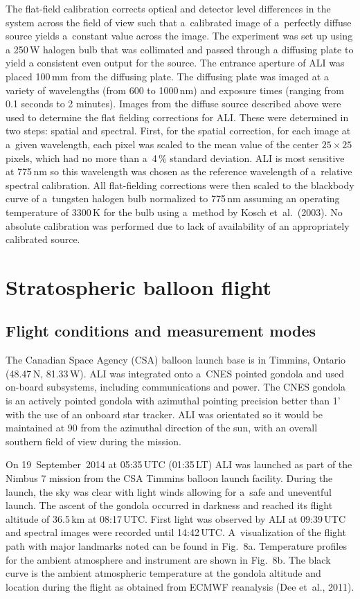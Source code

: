 \documentclass[amtd, online, hvmath]{copernicus}
\begin{document}
The flat-field calibration corrects optical and detector level
differences in the system across the field of view such that
a~calibrated image of a~perfectly diffuse source yields a~constant
value across the image. The experiment was set up using a 250\,W halogen bulb that was collimated and passed through a diffusing plate to yield a consistent even output for the source. The entrance aperture of ALI was placed 100\,mm from the diffusing plate. The diffusing plate was imaged at a variety of wavelengths (from 600 to 1000\,nm) and exposure times (ranging from 0.1 seconds to 2 minutes). Images from the diffuse source
described above were used to determine the flat fielding corrections
for ALI. These were determined in two steps: spatial and
spectral. First, for the spatial correction, for each image at a~given
wavelength, each pixel was scaled to the mean value of the center
$25\times 25$\,pixels, which had no more than a~4\,{\%} standard
deviation. ALI is most sensitive at 775\,\unit{nm} so this wavelength
was chosen as the reference wavelength of a~relative spectral
calibration. All flat-fielding corrections were then scaled to the
blackbody curve of a~tungsten halogen bulb normalized to
775\,\unit{nm} assuming an operating temperature of 3300\,\unit{K} for
the bulb using a~method by Kosch et~al.~(2003). No absolute
calibration was performed due to lack of availability of an
appropriately calibrated source.

\section{Stratospheric balloon flight}
\subsection{Flight conditions and measurement modes}

The Canadian Space Agency (CSA) balloon launch base is in Timmins,
Ontario (48.47{\degree}\,N, 81.33{\degree}\,W). ALI was integrated
onto a~CNES pointed gondola and used on-board subsystems, including
communications and power. The CNES gondola is an actively pointed
gondola with azimuthal pointing precision better than 1' with the use
of an onboard star tracker. ALI was orientated so it would be
maintained at 90{\degree} from the azimuthal direction of the sun,
with an overall southern field of view during the mission.

On 19~September~2014 at 05:35\,UTC (01:35\,LT) ALI was launched as
part of the Nimbus 7 mission from the CSA Timmins balloon launch
facility.  During the launch, the sky was clear with light winds
allowing for a~safe and uneventful launch. The ascent of the gondola
occurred in darkness and reached its flight altitude of
36.5\,\unit{km} at 08:17\,UTC. First light was observed by ALI at
09:39\,UTC and spectral images were recorded until 14:42\,UTC.
A~visualization of the flight path with major landmarks noted can be
found in Fig.~8a. Temperature profiles for the ambient atmosphere and
instrument are shown in Fig.~8b. The black curve is the ambient
atmospheric temperature at the gondola altitude and location during
the flight as obtained from ECMWF reanalysis (Dee et~al., 2011).
\end{document}
